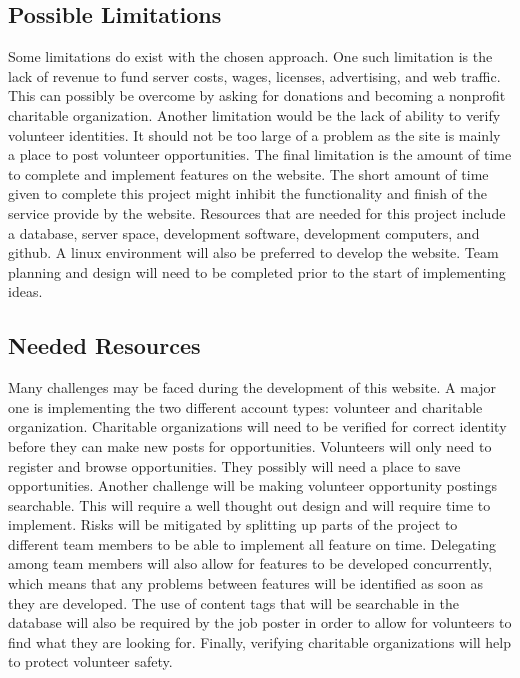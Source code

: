 \documentclass[12pt]{article}
\begin{document}
\subsection{Possible Limitations}
Some limitations do exist with the chosen approach.  One such limitation is the lack of revenue to fund server costs, wages, licenses, advertising, and web traffic.  This can possibly be overcome by asking for donations and becoming a nonprofit charitable organization.  Another limitation would be the lack of ability to verify volunteer identities.  It should not be too large of a problem as the site is mainly a place to post volunteer opportunities.  The final limitation is the amount of time to complete and implement features on the website.  The short amount of time given to complete this project might inhibit the functionality and finish of the service provide by the website.
Resources that are needed for this project include a database, server space, development software, development computers, and github.  A linux environment will also be preferred to develop the website.  Team planning and design will need to be completed prior to the start of implementing ideas.\\

\subsection{Needed Resources}
Many challenges may be faced during the development of this website.  A major one is implementing the two different account types:  volunteer and charitable organization.  Charitable organizations will need to be verified for correct identity before they can make new posts for opportunities.  Volunteers will only need to register and browse opportunities.  They possibly will need a place to save opportunities.  Another challenge will be making volunteer opportunity postings searchable.  This will require a well thought out design and will require time to implement.  Risks will be mitigated by splitting up parts of the project to different team members to be able to implement all feature on time.  Delegating among team members will also allow for features to be developed concurrently, which means that any problems between features will be identified as soon as they are developed.  The use of content tags that will be searchable in the database will also be required by the job poster in order to allow for volunteers to find what they are looking for.  Finally, verifying charitable organizations will help to protect volunteer safety.\\
\end{document}

